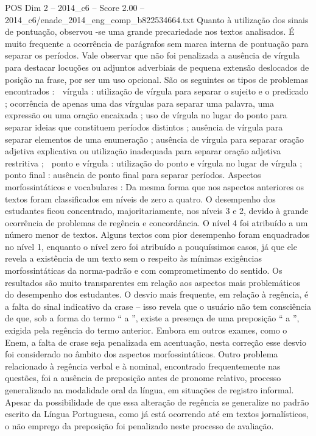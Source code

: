 \begin{textsample}{POS Dim 2 – 2014\_c6 – Score 2.00 – 2014\_c6/enade\_2014\_eng\_comp\_b822534664.txt}
Quanto à utilização dos sinais de pontuação, observou -se uma grande precariedade nos textos analisados.
É muito frequente a ocorrência de parágrafos sem marca interna de pontuação para separar os períodos.
Vale observar que não foi penalizada a ausência de vírgula para destacar locuções ou adjuntos adverbiais de pequena extensão deslocados de posição na frase, por ser um uso opcional.
São os seguintes os tipos de problemas encontrados :  vírgula : utilização de vírgula para separar o sujeito e o predicado ; ocorrência de apenas uma das vírgulas para separar uma palavra, uma expressão ou uma oração encaixada ; uso de vírgula no lugar do ponto para separar ideias que constituem períodos distintos ; ausência de vírgula para separar elementos de uma enumeração ; ausência de vírgula para separar oração adjetiva explicativa ou utilização inadequada para separar oração adjetiva restritiva ;  ponto e vírgula : utilização do ponto e vírgula no lugar de vírgula ;  ponto final : ausência de ponto final para separar períodos.
Aspectos morfossintáticos e vocabulares : Da mesma forma que nos aspectos anteriores os textos foram classificados em níveis de zero a quatro.
O desempenho dos estudantes ficou concentrado, majoritariamente, nos níveis 3 e 2, devido à grande ocorrência de problemas de regência e concordância.
O nível 4 foi atribuído a um número menor de textos.
Alguns textos com pior desempenho foram enquadrados no nível 1, enquanto o nível zero foi atribuído a pouquíssimos casos, já que ele revela a existência de um texto sem o respeito às mínimas exigências morfossintáticas da norma-padrão e com comprometimento do sentido.
Os resultados são muito transparentes em relação aos aspectos mais problemáticos do desempenho dos estudantes.
O desvio mais frequente, em relação à regência, é a falta do sinal indicativo da crase – isso revela que o usuário não tem consciência de que, sob a forma do termo “ a ”, existe a presença de uma preposição “ a ”, exigida pela regência do termo anterior.
Embora em outros exames, como o Enem, a falta de crase seja penalizada em acentuação, nesta correção esse desvio foi considerado no âmbito dos aspectos morfossintáticos.
Outro problema relacionado à regência verbal e à nominal, encontrado frequentemente nas questões, foi a ausência de preposição antes de pronome relativo, processo generalizado na modalidade oral da língua, em situações de registro informal.
Apesar da possibilidade de que essa alteração de regência se generalize no padrão escrito da Língua Portuguesa, como já está ocorrendo até em textos jornalísticos, o não emprego da preposição foi penalizado neste processo de avaliação.

\end{textsample}
